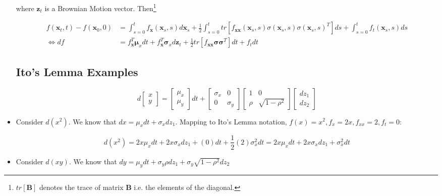 \documentclass{article}
\newcommand{\xbf}{\mathbf{x}}
\newcommand{\zbf}{\mathbf{z}}
\newcommand{\mubf}{\boldsymbol{\mu}}
\newcommand{\sigmabf}{\boldsymbol{\sigma}}
\begin{document}
\begin{itemize}
where $\zbf_t$ is a Brownian Motion vector. Then\footnote{$tr[\mathbf{B}]$ denotes the trace of matrix $\mathbf{B}$ i.e. the elements of the diagonal.}

\begin{align*}
f(\xbf_t, t) - f(\xbf_0, 0) &= \int_{s=0}^t f_\xbf(\xbf_s, s) d\xbf_s + \frac{1}{2} \int_{s=0}^t tr[f_{\xbf\xbf} (\xbf_s, s) \sigma(\xbf_s, s)\sigma(\xbf_s, s)^T] ds + \int_{s=0}^t f_t(\xbf_s, s) ds\\
\iff
df &= f_\xbf^T \mubf_x dt + f_\xbf^T \sigmabf_x d\zbf_t + \frac{1}{2} tr[f_{\xbf\xbf} \sigmabf\sigmabf^T] dt + f_t dt
\end{align*}

\subsection*{Ito's Lemma Examples}

$$
d \begin{bmatrix} x \\ y \end{bmatrix} = \begin{bmatrix} \mu_x \\ \mu_y \end{bmatrix} dt + \begin{bmatrix} \sigma_x & 0 \\ 0 & \sigma_y \end{bmatrix} \begin{bmatrix} 1 & 0 \\ \rho & \sqrt{1 - \rho^2} \end{bmatrix} \begin{bmatrix} dz_1 \\ dz_2 \end{bmatrix}
$$

\item Consider $d(x^2)$.  We know that $dx = \mu_x dt + \sigma_x dz_1$. Mapping to Ito's Lemma notation, $f(x) = x^2, f_x = 2x, f_{xx} = 2, f_t = 0$:

$$
d(x^2) = 2x \mu_x dt + 2x \sigma_x dz_1 + (0) dt + \frac{1}{2} (2)\sigma_x^2 dt = 2x \mu_x dt + 2x \sigma_x dz_1 + \sigma_x^2dt 
$$

\item Consider $d(xy)$. We know that $dy = \mu_y dt + \sigma_y \rho dz_1 + \sigma_y \sqrt{1 - \rho^2} dz_2$


\end{itemize}
\end{document}
